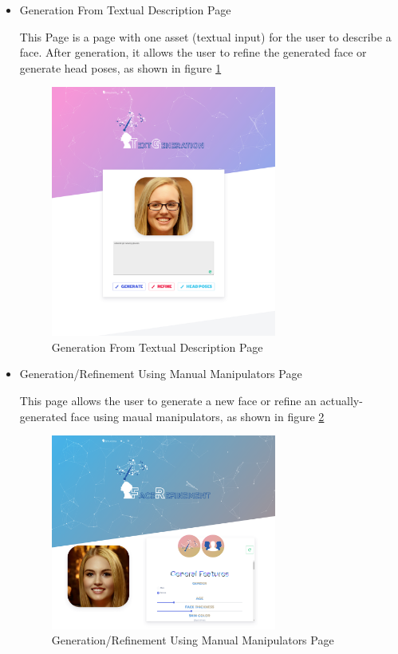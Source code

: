\begin{itemize}
    
    \item Generation From Textual Description Page
    
    This Page is a page with one asset (textual input) for the user to describe a face. After generation, it allows the user to refine the generated face or generate head poses, as shown in figure \ref{fig:text}
    
    \begin{figure}[H]
        \centering
        \includegraphics[width=0.7\textwidth]{images/website/text.png}
        \caption{Generation From Textual Description Page}
        \label{fig:text}
    \end{figure}
    
    \item Generation/Refinement Using Manual Manipulators Page
    
    This page allows the user to generate a new face or refine an actually-generated face using maual manipulators, as shown in figure \ref{fig:refine}
    
    \begin{figure}[H]
        \centering
        \includegraphics[width=0.7\textwidth]{images/website/refine1.png}
        \caption{Generation/Refinement Using Manual Manipulators Page}
        \label{fig:refine}
    \end{figure}
    

\end{itemize}
